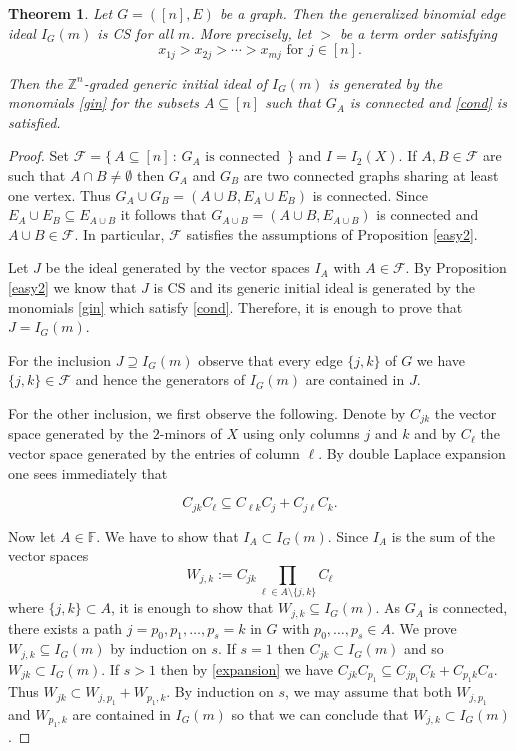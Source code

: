 \documentclass{amsart}
\newtheorem{theorem}{Theorem}[section]
\theoremstyle{definition}
\numberwithin{equation}{section}
\def\FF{\mathbb{F}}
\def\ZZ{\mathbb{Z}}
\begin{document}
 \begin{theorem} 
 \label{main} Let $G = ([n],E)$ be a graph. 
 Then the generalized binomial edge ideal $I_G(m)$ is CS for all $m$. 
 More precisely, let $>$ be a term order satisfying
 $$x_{1j}>x_{2j} > \cdots > x_{mj} \text{ for } j \in [n].$$
 
 Then  the $\ZZ^n$-graded  generic initial ideal of $I_G(m)$ is generated by the monomials \eqref{gin} for the subsets $A \subseteq[n]$
 such that $G_A$ is connected and \eqref{cond} is satisfied.
\end{theorem}
\begin{proof} 
Set   $\mathcal F=\big\{\, A\subseteq [n]\, :\, G_A \text{ is connected }\,\}$ and  $I=I_2(X)$.  
If $A,B \in \mathcal F$ are
such that $A \cap B \neq \emptyset$ then $G_A$ and $G_B$ are two
connected graphs sharing at least one vertex. Thus 
$G_A \cup G_B = (A \cup B, E_A \cup E_B)$ is connected. Since
$E_A \cup E_B \subseteq E_{A \cup B}$ it follows that
$G_{A \cup B} = (A \cup B,E_{A\cup B})$ is connected and
$A \cup B \in \mathcal F$. In particular, $\mathcal F$
satisfies the assumptions of Proposition \ref{easy2}.

Let $J$ be the ideal generated by the vector spaces $I_A$ with $A\in \mathcal F$. By Proposition \ref{easy2} we know that $J$ is CS and 
its generic initial ideal is generated by the monomials \eqref{gin}
which satisfy \eqref{cond}. Therefore, it is enough to prove that $J=I_G(m)$. 

For the inclusion $J\supseteq I_G(m)$ observe that every edge $\{j,k\}$ of $G$ we have  $\{j,k\}\in \mathcal F$ and hence the generators of $I_G(m)$ are contained in $J$.  

For the other inclusion, we first observe the following. 
Denote by $C_{jk}$ the vector space  generated by the $2$-minors of $X$ using only columns $j$ and $k$ and by $C_\ell$ the vector space generated by the entries of column $\ell$. By double Laplace expansion one sees immediately that 

\begin{equation}
\label{expansion} 
 C_{jk} C_{\ell} \subseteq C_{\ell k} C_{j}  +  C_{j \ell} C_{k} .
\end{equation} 

Now let $A\in \FF$. We have to show that $I_A\subset I_G(m)$.   Since  $I_A$ is the sum of the vector spaces 
$$W_{j,k}:=C_{jk}\prod_{\ell\in A\setminus\{j,k\} }C_\ell$$ 
where $ \{j,k\}\subset A$, it is enough to show that $W_{j,k}\subseteq I_G(m)$.  As $G_A$ is connected, there exists a path $j=p_0,p_1,\dots, p_s=k$ in $G$ with $p_0,\ldots,p_s\in A$. 
We prove $W_{j,k} \subseteq I_G(m)$ by induction on $s$. 
If $s=1$ then $C_{jk} \subset I_G(m)$ and so $W_{jk} \subset  I_G(m)$. If $s>1$ then
by \eqref{expansion} we have
$C_{jk}C_{p_1}\subseteq C_{jp_1}C_{k}+C_{p_1k}C_{a}$. 
Thus  
$W_{jk} \subset W_{j,p_1}+W_{p_1,k}$. By induction on $s$, we may assume that both $W_{j,p_1}$ and $W_{p_1,k}$ are contained in $I_G(m)$ so that we can conclude that 
$W_{j,k}\subset   I_G(m)$. 
  \end{proof}  
\end{document}
